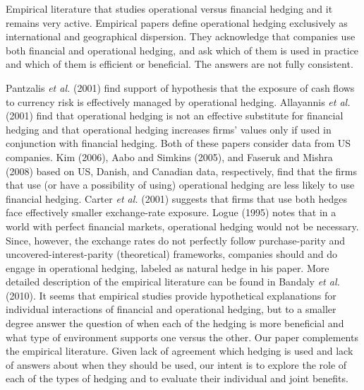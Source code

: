 \documentclass[mnsc,nonblindrev,copyedit]{informs2_wz} %
\newcommand{\OUT}[1]{}
\begin{document}
Empirical literature that studies operational versus financial hedging and it remains very active.
Empirical papers define operational hedging exclusively as international and geographical dispersion.  They acknowledge that companies use both financial and operational hedging, and ask which of them is used in practice and which of them is efficient or beneficial.  The answers are not fully consistent.   

Pantzalis {\it et al.} (2001) find support of hypothesis that the exposure of cash flows to currency risk is effectively managed by operational hedging.
Allayannis {\it et al.} (2001) find that operational hedging is not an effective substitute for financial hedging and that operational hedging increases firms' values only if used in conjunction with financial hedging.  \OUT{The market value of the firm is not influenced by use of operational hedging alone.  However, it may increase, if the firm is already using financial hedging.}   Both of these papers consider data from US companies. 
Kim (2006), Aabo and Simkins (2005), and Faseruk and Mishra (2008) based on US, Danish, and Canadian data, respectively, find that the firms that use (or have a possibility of using) operational hedging are less likely to use financial hedging. Carter {\it et al.} (2001) suggests that firms that use both hedges face effectively smaller exchange-rate exposure.  Logue (1995) notes that in a world with perfect financial markets, operational hedging would not be necessary.  Since, however, the exchange rates do not perfectly follow purchase-parity and uncovered-interest-parity (theoretical) frameworks, companies should and do engage in operational hedging, labeled as natural hedge in his paper.
More detailed description of the empirical literature can be found in Bandaly {\it et al.} (2010). It seems that empirical studies provide hypothetical explanations for individual interactions of financial and operational hedging, but to a smaller degree answer the question of when each of the hedging is more beneficial and what type of environment supports one versus the other.  Our paper complements the empirical literature.  Given lack of agreement which hedging is used and lack of answers about when they should be used, our intent is to explore the role of each of the types of hedging and to evaluate their individual and joint benefits. 
\end{document}
